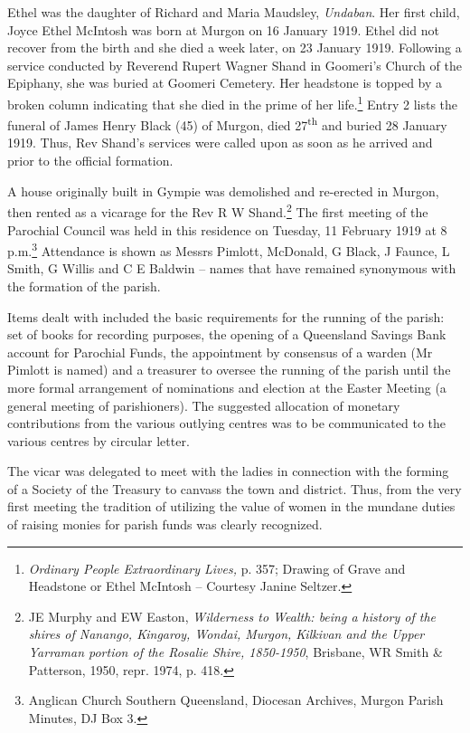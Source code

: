 Ethel was the daughter of Richard and Maria Maudsley, \emph{Undaban}. Her first child, Joyce Ethel McIntosh was born at Murgon on 16 January 1919. Ethel did not recover from the birth and she died a week later, on 23 January 1919. Following a service conducted by Reverend Rupert Wagner Shand in Goomeri's Church of the Epiphany, she was buried at Goomeri Cemetery. Her headstone is topped by a broken column indicating that she died in the prime of her life.\footnote{\emph{Ordinary People Extraordinary Lives,} p. 357; Drawing of Grave and Headstone or Ethel McIntosh -- Courtesy Janine Seltzer.} Entry 2 lists the funeral of James Henry Black (45) of Murgon, died 27\textsuperscript{th} and buried 28 January 1919. Thus, Rev Shand's services were called upon as soon as he arrived and prior to the official formation.


A house originally built in Gympie was demolished and re-erected in Murgon, then rented as a vicarage for the Rev R W Shand.\footnote{JE Murphy and EW Easton, \emph{Wilderness to Wealth: being a history of the shires of Nanango, Kingaroy, Wondai, Murgon, Kilkivan and the Upper Yarraman portion of the Rosalie Shire, 1850-1950}, Brisbane, WR Smith \& Patterson, 1950, repr. 1974, p. 418.} The first meeting of the Parochial Council was held in this residence on Tuesday, 11 February 1919 at 8 p.m.\footnote{Anglican Church Southern Queensland, Diocesan Archives, Murgon Parish Minutes, DJ Box 3.} Attendance is shown as Messrs Pimlott, McDonald, G Black, J Faunce, L Smith, G Willis and C E Baldwin -- names that have remained synonymous with the formation of the parish.


Items dealt with included the basic requirements for the running of the parish: set of books for recording purposes, the opening of a Queensland Savings Bank account for Parochial Funds, the appointment by consensus of a warden (Mr Pimlott is named) and a treasurer to oversee the running of the parish until the more formal arrangement of nominations and election at the Easter Meeting (a general meeting of parishioners). The suggested allocation of monetary contributions from the various outlying centres was to be communicated to the various centres by circular letter.



The vicar was delegated to meet with the ladies in connection with the forming of a Society of the Treasury to canvass the town and district. Thus, from the very first meeting the tradition of utilizing the value of women in the mundane duties of raising monies for parish funds was clearly recognized.



